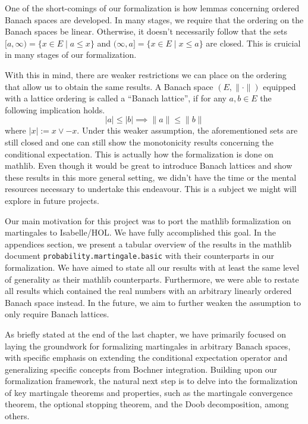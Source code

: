 One of the short-comings of our formalization is how lemmas concerning ordered Banach spaces are developed. In many stages, we require that the ordering on the Banach spaces be linear. Otherwise, it doesn't necessarily follow that the sets $[a,\infty) = \{x \in E\;\vert\; a \le x\}$ and $(\infty, a] = \{x \in E\;\vert\; x \le a\}$ are closed. This is cruicial in many stages of our formalization. 

With this in mind, there are weaker restrictions we can place on the ordering that allow us to obtain the same results. A Banach space $(E, \lVert \cdot \rVert)$ equipped with a lattice ordering is called a ``Banach lattice'', if for any $a, b\in E$ the following implication holds.
\[
	\lvert a \rvert \le \lvert b \rvert \implies \lVert a \rVert \le \lVert b \rVert
\]
where $\lvert x \rvert := x \vee -x$. Under this weaker assumption, the aforementioned sets are still closed and one can still show the monotonicity results concerning the conditional expectation. This is actually how the formalization is done on \textsf{mathlib}. Even though it would be great to introduce Banach lattices and show these results in this more general setting, we didn't have the time or the mental resources necessary to undertake this endeavour. This is a subject we might will explore in future projects.

Our main motivation for this project was to port the \textsf{mathlib} formalization on martingales to Isabelle/HOL. We have fully accomplished this goal. In the appendices section, we present a tabular overview of the results in the \textsf{mathlib} document \texttt{probability.mar\-tingale.basic} with their counterparts in our formalization. We have aimed to state all our results with at least the same level of generality as their \textsf{mathlib} counterparts. Furthermore, we were able to restate all results which contained the real numbers with an arbitrary linearly ordered Banach space instead. In the future, we aim to further weaken the assumption to only require Banach lattices.

As briefly stated at the end of the last chapter, we have primarily focused on laying the groundwork for formalizing martingales in arbitrary Banach spaces, with specific emphasis on extending the conditional expectation operator and generalizing specific concepts from Bochner integration. Building upon our formalization framework, the natural next step is to delve into the formalization of key martingale theorems and properties, such as the martingale convergence theorem, the optional stopping theorem, and the Doob decomposition, among others. 

